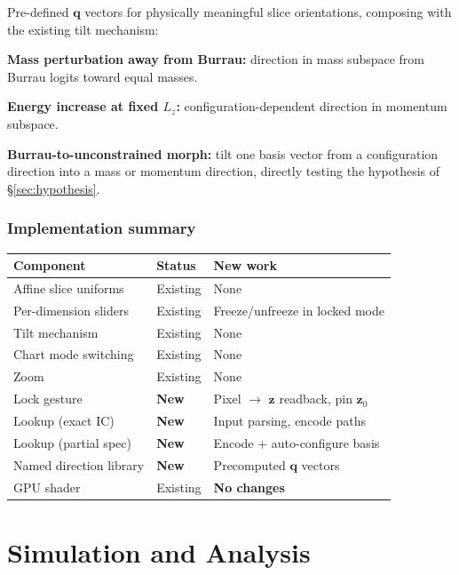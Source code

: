 \documentclass[11pt]{report}
\begin{document}
Pre-defined $\mathbf q$ vectors for physically meaningful slice orientations, composing with the existing tilt mechanism:

\textbf{Mass perturbation away from Burrau:} direction in mass subspace from Burrau logits toward equal masses.

\textbf{Energy increase at fixed $L_z$:} configuration-dependent direction in momentum subspace.

\textbf{Burrau-to-unconstrained morph:} tilt one basis vector from a configuration direction into a mass or momentum direction, directly testing the hypothesis of \S\ref{sec:hypothesis}.

\section{Implementation summary}
\label{sec:interaction_summary}

\begin{center}
\begin{tabular}{lll}
\toprule
Component & Status & New work \\
\midrule
Affine slice uniforms & Existing & None \\
Per-dimension sliders & Existing & Freeze/unfreeze in locked mode \\
Tilt mechanism & Existing & None \\
Chart mode switching & Existing & None \\
Zoom & Existing & None \\
Lock gesture & \textbf{New} & Pixel $\to$ $\mathbf z$ readback, pin $\mathbf z_0$ \\
Lookup (exact IC) & \textbf{New} & Input parsing, encode paths \\
Lookup (partial spec) & \textbf{New} & Encode + auto-configure basis \\
Named direction library & \textbf{New} & Precomputed $\mathbf q$ vectors \\
GPU shader & Existing & \textbf{No changes} \\
\bottomrule
\end{tabular}
\end{center}

\newpage
\part{Simulation and Analysis}
\label{part:sim}
\end{document}
